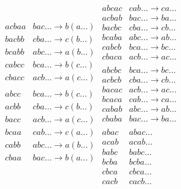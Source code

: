 \documentclass[a4paper]{article}
\begin{document}
\[\begin{array}{ll}
acbaa & bac\dots \to b(a\dots) \\
bacbb & cba\dots \to c(b\dots) \\
bcabb & abc\dots \to a(b\dots) \\
cabcc & bca\dots \to b(c\dots) \\
cbacc & acb\dots \to a(c\dots) \\
\\
abcc & bca\dots \to b(c\dots) \\
acbb & cba\dots \to c(b\dots) \\
bacc & acb\dots \to a(c\dots) \\
bcaa & cab\dots \to c(a\dots) \\
cabb & abc\dots \to a(b\dots) \\
cbaa & bac\dots \to b(a\dots) \\
\\
\end{array}
\begin{array}{ll}
abcac & cab\dots \to ca\dots \\
acbab & bac\dots \to ba\dots \\
bacbc & cba\dots \to cb\dots \\
bcaba & abc\dots \to ab\dots \\
cabcb & bca\dots \to bc\dots \\
cbaca & acb\dots \to ac\dots \\
\\
abcbc & bca\dots \to bc\dots \\
acbcb & cba\dots \to cb\dots \\
bacac & acb\dots \to ac\dots \\
bcaca & cab\dots \to ca\dots \\
cabab & abc\dots \to ab\dots \\
cbaba & bac\dots \to ba\dots \\
\\
abac & abac\dots \\
acab & acab\dots \\
babc & babc\dots \\
bcba & bcba\dots \\
cbca & cbca\dots \\
cacb & cacb\dots \\
\end{array}
\]
\end{document}
